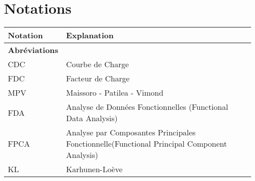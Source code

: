\section*{Notations}
\begin{tabularx}{\textwidth}{lX}
	\toprule
	\textbf{Notation}                                                & \textbf{Explanation}                                                                                                                                                                                       \\
	\midrule
	\textbf{Abréviations}                                                                                                                                                                                                                                                         \\
	\midrule
	CDC                                                              & Courbe de Charge                                                                                                                                                                                           \\
	FDC                                                              & Facteur de Charge                                                                                                                                                                                          \\
	MPV                                                              & Maissoro - Patilea - Vimond                                                                                                                                                                                \\
	FDA                                                              & Analyse de Données Fonctionnelles (Functional Data Analysis)                                                                                                                                               \\
	FPCA                                                             & Analyse par Composantes Principales Fonctionnelle(Functional Principal Component Analysis)                                                                                                                 \\
	KL                                                               & Karhunen-Loève                                                                                                                                                                                             \\

\end{tabularx}
